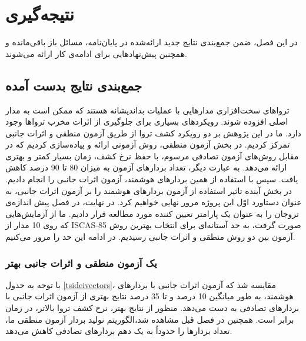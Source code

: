
\chapter{نتیجه‌گیری}

در این فصل، ضمن جمع‌بندی نتایج جدید ارائه‌شده در پایان‌نامه، 
مسائل باز باقی‌مانده و همچنین پیش‌نهادهایی برای ادامه‌ی کار ارائه می‌شوند.

\section{جمع‌بندی نتایج بدست آمده}
تروا‌های سخت‌افزاری مدارهایی با عملیات بداندیشانه هستند که ممکن است به مدار اصلی افزوده شوند. رویکردهای بسیاری برای جلوگیری از اثرات مخرب ترواها وجود دارد. ما در این پژوهش بر دو رویکرد کشف تروا از طریق آزمون منطقی و اثرات جانبی تمرکز کردیم. در بخش آزمون منطقی، روش آزمونی ارائه و پیاده‌سازی کردیم که در مقابل روش‌های آزمون تصادفی مرسوم، با حفظ نرخ کشف، زمان بسیار کمتر و بهتری ارائه می‌دهد. به عبارت دیگر، تعداد بردارهای آزمون به میزان 80 تا 90 درصد کاهش یافت. سپس با استفاده از همین بردارهای هوشمند، آزمون اثرات جانبی را انجام دادیم. در بخش آینده تاثیر استفاده از آزمون بردارهای هوشمند را بر آزمون اثرات جانبی، به عنوان دستاورد اوّل این پروژه مرور نهایی خواهیم کرد. در نهایت، در فصل پیش اندازه‌ی تروجان را به عنوان یک پارامتر تعیین کننده مورد مطالعه قرار دادیم. ما از آزمایش‌هایی که روی 10 مدار از ISCAS-85 صورت گرفت، به حد آستانه‌ای برای انتخاب بهترین روش آزمون بین دو روش منطقی و اثرات جانبی رسیدیم. در ادامه این حد را مرور می‌کنیم.
\subsection{یک آزمون منطقی و اثرات جانبی بهتر}
با توجه به جدول \ref{tsideivectors}، مقایسه شد که آزمون اثرات جانبی با بردارهای هوشمند، به طور میانگین 10 درصد و تا 35 درصد نتایج بهتری از آزمون اثرات جانبی با بردارهای تصادفی به دست می‌دهد. منظور از نتایج بهتر، نرخ کشف تروا بالاتر، در زمان برابر است. همچنین  در فصل قبل مشاهده شد،الگوریتم نولید بردار آزمون منطقی ما، تعداد بردارها را حدوداً به یک دهم بردارهای تصادفی کاهش می‌دهد.

